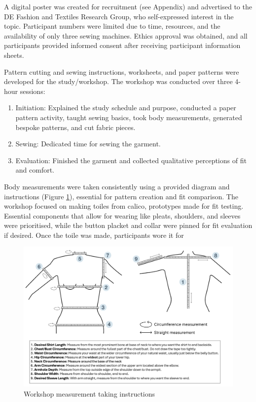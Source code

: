 A digital poster was created for recruitment (see Appendix) and advertised to the DE Fashion and Textiles Research Group, who self-expressed interest in the topic. Participant numbers were limited due to time, resources, and the availability of only three sewing machines. Ethics approval was obtained, and all participants provided informed consent after receiving participant information sheets.

Pattern cutting and sewing instructions, worksheets, and paper patterns were developed for the study/workshop. The workshop was conducted over three 4-hour sessions:

\begin{enumerate}
    \item Initiation: Explained the study schedule and purpose, conducted a paper pattern activity, taught sewing basics, took body measurements, generated bespoke patterns, and cut fabric pieces.
    \item Sewing: Dedicated time for sewing the garment.
    \item Evaluation: Finished the garment and collected qualitative perceptions of fit and comfort.
\end{enumerate}
Body measurements were taken consistently using a provided diagram and instructions (Figure \ref{fig:workshopmeasure}), essential for pattern creation and fit comparison. The workshop focused on making toiles from calico, prototypes made for fit testing. Essential components that allow for wearing like pleats, shoulders, and sleeves were prioritised, while the button placket and collar were pinned for fit evaluation if desired. Once the toile was made, participants wore it for


\begin{figure} [htb]
    \centering
    \includegraphics[width = \textwidth]{Images/workshopmeasure.png}
    \caption{Workshop measurement taking instructions}
    \label{fig:workshopmeasure}
\end{figure}


